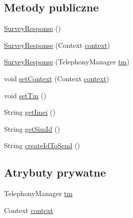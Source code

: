 \subsection*{Metody publiczne}
\begin{DoxyCompactItemize}
\item 
\hyperlink{classcom_1_1example_1_1qrpoll_1_1_survey_response_a13d182139934cfb2f681515e76628786}{Survey\+Response} ()
\item 
\hyperlink{classcom_1_1example_1_1qrpoll_1_1_survey_response_af1338f35c7aa2f3b1f8b1d90b0c1fa41}{Survey\+Response} (Context \hyperlink{classcom_1_1example_1_1qrpoll_1_1_survey_response_a9bfbee3bd0f78b7652a590063c6e7073}{context})
\item 
\hyperlink{classcom_1_1example_1_1qrpoll_1_1_survey_response_a5f4e8e2b1847aca4f0ea56c2c7e6ae46}{Survey\+Response} (Telephony\+Manager \hyperlink{classcom_1_1example_1_1qrpoll_1_1_survey_response_ad4ac570c04a756ac4eaa8622186d5933}{tm})
\item 
void \hyperlink{classcom_1_1example_1_1qrpoll_1_1_survey_response_a7c51f0ae34b99c47669f8ea210c9f214}{set\+Context} (Context \hyperlink{classcom_1_1example_1_1qrpoll_1_1_survey_response_a9bfbee3bd0f78b7652a590063c6e7073}{context})
\item 
void \hyperlink{classcom_1_1example_1_1qrpoll_1_1_survey_response_a8513757cb70751abd35ecd4ca292362e}{set\+Tm} ()
\item 
String \hyperlink{classcom_1_1example_1_1qrpoll_1_1_survey_response_ab06ccbc70c50e72eb089134884f1e6ac}{get\+Imei} ()
\item 
String \hyperlink{classcom_1_1example_1_1qrpoll_1_1_survey_response_a5edce8d8944d575ec23b7f567419cd01}{get\+Sim\+Id} ()
\item 
String \hyperlink{classcom_1_1example_1_1qrpoll_1_1_survey_response_a9adfd3c055deca07bf913d65a85c7bad}{create\+Id\+To\+Send} ()
\end{DoxyCompactItemize}
\subsection*{Atrybuty prywatne}
\begin{DoxyCompactItemize}
\item 
Telephony\+Manager \hyperlink{classcom_1_1example_1_1qrpoll_1_1_survey_response_ad4ac570c04a756ac4eaa8622186d5933}{tm}
\item 
Context \hyperlink{classcom_1_1example_1_1qrpoll_1_1_survey_response_a9bfbee3bd0f78b7652a590063c6e7073}{context}
\end{DoxyCompactItemize}


